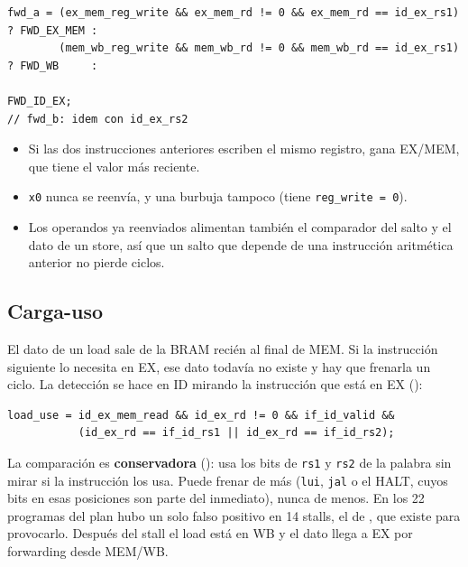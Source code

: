 \begin{lstlisting}[style=verilog,numbers=none]
fwd_a = (ex_mem_reg_write && ex_mem_rd != 0 && ex_mem_rd == id_ex_rs1) ? FWD_EX_MEM :
        (mem_wb_reg_write && mem_wb_rd != 0 && mem_wb_rd == id_ex_rs1) ? FWD_WB     :
                                                                         FWD_ID_EX;
// fwd_b: idem con id_ex_rs2
\end{lstlisting}

\begin{itemize}[nosep]
  \item Si las dos instrucciones anteriores escriben el mismo registro, gana EX/MEM, que tiene el
        valor más reciente.
  \item \texttt{x0} nunca se reenvía, y una burbuja tampoco (tiene \texttt{reg\_write = 0}).
  \item Los operandos ya reenviados alimentan también el comparador del salto y el dato de un
        store, así que un salto que depende de una instrucción aritmética anterior no pierde
        ciclos.
\end{itemize}


\subsection{Carga-uso}

El dato de un load sale de la BRAM recién al final de MEM. Si la instrucción siguiente lo
necesita en EX, ese dato todavía no existe y hay que frenarla un ciclo. La detección se hace en ID
mirando la instrucción que está en EX ():

\begin{lstlisting}[style=verilog,numbers=none]
load_use = id_ex_mem_read && id_ex_rd != 0 && if_id_valid &&
           (id_ex_rd == if_id_rs1 || id_ex_rd == if_id_rs2);
\end{lstlisting}

La comparación es \textbf{conservadora} (): usa los bits de \texttt{rs1} y
\texttt{rs2} de la palabra sin mirar si la instrucción los usa. Puede frenar de más
(\texttt{lui}, \texttt{jal} o el HALT, cuyos bits en esas posiciones son parte del inmediato),
nunca de menos. En los 22 programas del plan hubo un solo falso positivo en 14 stalls, el de
, que existe para provocarlo. Después del stall el load está en WB y el dato
llega a EX por forwarding desde MEM/WB.

